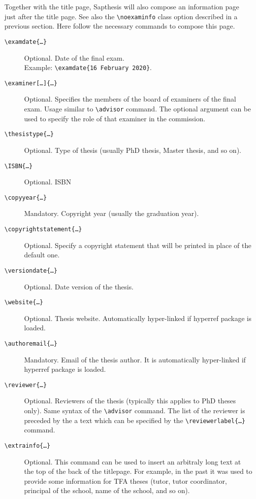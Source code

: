 \documentclass[a5paper,11pt]{article}
\newcommand{\bs}{\textbackslash}
\begin{document}
Together with the title page, \textsf{Sapthesis} will also compose an information page just after the title page. See also the \texttt{\bs noexaminfo} class option described in a previous section. Here follow the necessary commands to compose this page.
\begin{description}
\item[\texttt{\bs examdate\{\dots\}}] Optional. Date of the final exam.\\
Example: \texttt{\bs examdate\{16 February 2020\}}.

\item[\texttt{\bs examiner[\dots]\{\dots\}}] Optional. Specifies the members of the
board of examiners of the final exam. Usage similar to \texttt{\bs advisor} command. The optional argument can be used to specify the role of that examiner in the commission.

\item[\texttt{\bs thesistype\{\dots\}}] Optional. Type of thesis (usually PhD thesis, Master thesis, and so on). 

\item[\texttt{\bs ISBN\{\dots\}}] Optional. ISBN

\item[\texttt{\bs copyyear\{\dots\}}] Mandatory. Copyright year (usually the 
graduation year).

\item[\texttt{\bs copyrightstatement\{\dots\}}] Optional. Specify a copyright statement that will be printed in place of the default one.

\item[\texttt{\bs versiondate\{\dots\}}] Optional. Date version of the thesis.

\item[\texttt{\bs website\{\dots\}}] Optional. Thesis website. Automatically 
hyper-linked if \textsf{hyperref} package is loaded.

\item[\texttt{\bs authoremail\{\dots\}}] Mandatory. Email of the thesis author.
It is automatically hyper-linked if \textsf{hyperref} package is loaded.

\item[\texttt{\bs reviewer\{\dots\}}] Optional. Reviewers of the thesis (typically this applies to PhD theses only). Same syntax of the \texttt{\bs advisor} command. The list of the reviewer is preceded by the a text which can be specified by the \texttt{\bs reviewerlabel\{\dots\}} command.

\item[\texttt{\bs extrainfo\{\dots\}}] Optional. This command can be used to insert an arbitraly long text at the top of the back of the titlepage. For example, in the past it was used to provide some information for TFA theses (tutor, tutor coordinator, principal of the school, name of the school, and so on). 


\end{description}
\end{document}
